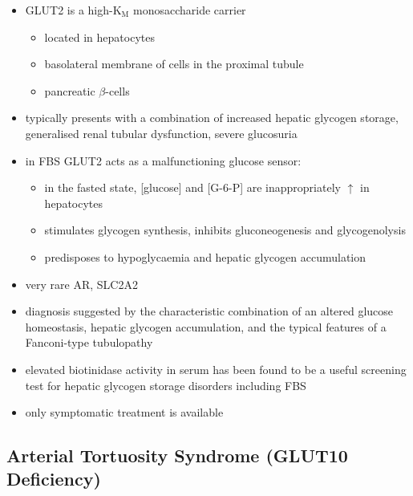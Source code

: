 \documentclass{scrartcl}
\begin{document}
\begin{itemize}
\item GLUT2 is a high-K\(_{\text{M}}\) monosaccharide carrier 
\begin{itemize}
\item located in hepatocytes
\item basolateral membrane of cells in the proximal tubule
\item pancreatic \(\beta\)-cells
\end{itemize}

\item typically presents with a combination of increased hepatic
glycogen storage, generalised renal tubular dysfunction, severe glucosuria

\item in FBS GLUT2 acts as a malfunctioning glucose sensor:
\begin{itemize}
\item in the fasted state, [glucose] and [G-6-P] are inappropriately \(\uparrow\) in hepatocytes
\item stimulates glycogen synthesis, inhibits gluconeogenesis and glycogenolysis
\item predisposes to hypoglycaemia and hepatic glycogen accumulation
\end{itemize}

\item very rare AR, SLC2A2

\item diagnosis suggested by the characteristic combination of an altered
glucose homeostasis, hepatic glycogen accumulation, and the typical
features of a Fanconi-type tubulopathy

\item elevated biotinidase activity in serum has been found to be a useful
screening test for hepatic glycogen storage disorders including FBS

\item only symptomatic treatment is available
\end{itemize}

\subsection{Arterial Tortuosity Syndrome (GLUT10 Deficiency)}
\label{sec:org0e11892}
\end{document}
